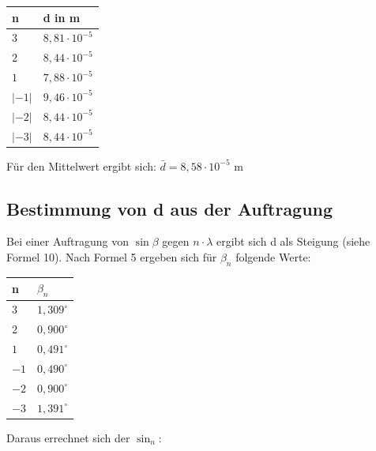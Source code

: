 \documentclass[12pt,a4paper,titlepage,headinclude,bibtotoc]{scrartcl}
\begin{document}
\begin{table} [h]
\centering
\begin{tabular}{|p{4 cm}||p{4 cm}|}
        \hline
		n & d in m \\
         \hline 
         $3$ & $8,81\cdot 10^{-5}$  \\
         \hline
         $2$ & $8,44 \cdot 10 ^{-5}$ \\
         \hline
         $1$ & $7,88\cdot 10^{-5}$\\
         \hline
         $|-1|$ & $9,46 \cdot 10^{-5} $   \\
         \hline
         $|-2|$ & $8,44\cdot 10^{-5}  $  \\
         \hline             
         $|-3|$ & $8,44\cdot 10^{-5}$   \\
         \hline
\end{tabular}
\end{table}

Für den Mittelwert ergibt sich:
$\bar{d} = 8,58\cdot 10^{-5}$ m

\subsection{Bestimmung von d aus der Auftragung}

Bei einer Auftragung von $\sin\beta $ gegen $n \cdot \lambda $ ergibt sich d als Steigung (siehe Formel 10). 
Nach Formel 5 ergeben sich für $\beta_n$ folgende Werte:

\begin{table} [h]
\centering
\begin{tabular}{|p{4 cm}||p{4 cm}|}
        \hline
		n & $\beta_n$ \\
         \hline 
         $3$ & $1,309^\circ$  \\
         \hline
         $2$ & $0,900^\circ$ \\
         \hline
         $1$ & $0,491^\circ$\\
         \hline
         $-1$ & $0,490^\circ$   \\
         \hline
         $-2$ & $0,900^\circ$  \\
         \hline             
         $-3$ & $1,391^\circ$   \\
         \hline
\end{tabular}
\end{table}
\vspace{6cm}
Daraus errechnet sich der $\sin_n$:
\end{document}
